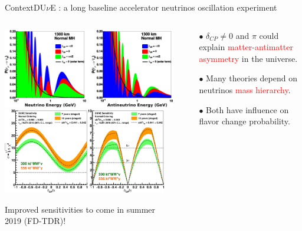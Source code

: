 \documentclass[10pt]{beamer}
\begin{document}
    \begin{frame}{Context}{DU$\nu$E : a long baseline accelerator neutrinos oscillation experiment}
    	\begin{columns}
    		\begin{column}{0.6\textwidth}
    			\centering
    			\includegraphics[width=\textwidth]{figures/contexte/oscillation_CP.png}\\\vspace{0.2cm}
    			 \includegraphics[width=0.95\textwidth]{figures/contexte/sensitivities_2.png}\\
    			 \begin{scriptsize}
    			 	Improved sensitivities to come in summer 2019 (FD-TDR)!
    			 \end{scriptsize}
    		\end{column}
    		\begin{column}{0.4\textwidth}
    			\begin{itemize}
	    			\item[$\bullet$]$\delta_{CP}\ne0$ and $\pi$ could explain \textcolor{red}{matter-antimatter asymmetry} in the universe.\\
	    			\item[$\bullet$] Many theories depend on neutrinos \textcolor{red}{mass hierarchy}.
	    			\item[$\bullet$] Both have influence on flavor change probability.

\end{itemize}
\end{column}
\end{columns}
\end{frame}
\end{document}
